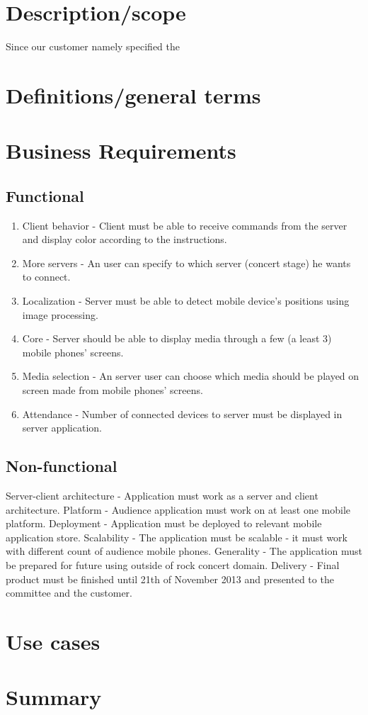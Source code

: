 \section{Description/scope}


Since our customer namely specified the 
\section{Definitions/general terms}
\section{Business Requirements}
\subsection{Functional}

\begin{enumerate}
\item Client behavior - Client must be able to receive commands from the server and display color according to the instructions.
\item More servers - An user can specify to which server (concert stage) he wants to connect.
\item Localization - Server must be able to detect mobile device's positions using image processing.
\item Core - Server should be able to display media through a few (a least 3) mobile phones' screens.
\item Media selection - An server user can choose which media should be played on screen made from mobile phones' screens.
\item Attendance - Number of connected devices to server must be displayed in server application.
\end{enumerate}

\subsection{Non-functional}

Server-client architecture - Application must work as a server and client architecture.
Platform - Audience application must work on at least one mobile platform.
Deployment - Application must be deployed to relevant mobile application store.
Scalability - The application must be scalable - it must work with different count of audience mobile phones.
Generality - The application must be prepared for future using outside of rock concert domain.
Delivery - Final product must be finished until 21th of November 2013 and presented to the committee and the customer.
\section{Use cases}
\section{Summary}
